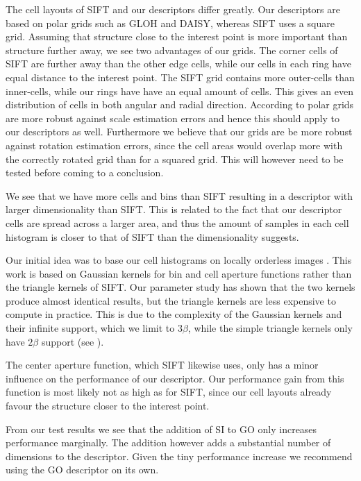 \documentclass[thesis.tex]{subfiles}
\begin{document}
The cell layouts of SIFT and our descriptors differ greatly. Our descriptors are based on polar grids such as GLOH and DAISY, whereas SIFT uses a square grid. Assuming that structure close to the interest point is more important than structure further away, we see two advantages of our grids. The corner cells of SIFT are further away than the other edge cells, while our cells in each ring have equal distance to the interest point. The SIFT grid contains more outer-cells than inner-cells, while our rings have have an equal amount of cells. This gives an even distribution of cells in both angular and radial direction. According to \citet{cui2009scale} polar grids are more robust against scale estimation errors and hence this should apply to our descriptors as well. Furthermore we believe that our grids are be more robust against rotation estimation errors, since the cell areas would overlap more with the correctly rotated grid than for a squared grid. This will however need to be tested before coming to a conclusion.

We see that we have more cells and bins than SIFT resulting in a descriptor with larger dimensionality than SIFT. This is related to the fact that our descriptor cells are spread across a larger area, and thus the amount of samples in each cell histogram is closer to that of SIFT than the dimensionality suggests.

Our initial idea was to base our cell histograms on locally orderless images \cite{koenderink1999structure}. This work is based on Gaussian kernels for bin and cell aperture functions rather than the triangle kernels of SIFT. Our parameter study has shown that the two kernels produce almost identical results, but the triangle kernels are less expensive to compute in practice. This is due to the complexity of the Gaussian kernels and their infinite support, which we limit to 3$\beta$, while the simple triangle kernels only have $2\beta$ support (see ).

The center aperture function, which SIFT likewise uses, only has a minor influence on the performance of our descriptor. Our performance gain from this function is most likely not as high as for SIFT, since our cell layouts already favour the structure closer to the interest point.

From our test results we see that the addition of SI to GO only increases performance marginally. The addition however adds a substantial number of dimensions to the descriptor.
Given the tiny performance increase we recommend using the GO descriptor on its own.
\end{document}
